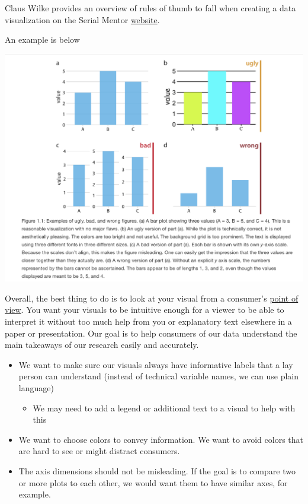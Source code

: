 \documentclass[
  letterpaper,
  DIV=11,
  numbers=noendperiod]{scrreprt}
\providecommand{\tightlist}{%
  \setlength{\itemsep}{0pt}\setlength{\parskip}{0pt}}\usepackage{longtable,booktabs,array}
\begin{document}
Claus Wilke provides an overview of rules of thumb to fall when creating
a data visualization on the Serial Mentor
\href{https://serialmentor.com/dataviz/}{website}.

An example is below

\includegraphics{images/ugbadwrong.png}

Overall, the best thing to do is to look at your visual from a
consumer's
\href{https://www.youtube.com/watch?v=nQJEp-k-ogs\&ab_channel=ArianaGrandeVevo}{point
of view}. You want your visuals to be intuitive enough for a viewer to
be able to interpret it without too much help from you or explanatory
text elsewhere in a paper or presentation. Our goal is to help consumers
of our data understand the main takeaways of our research easily and
accurately.

\begin{itemize}
\tightlist
\item
  We want to make sure our visuals always have informative labels that a
  lay person can understand (instead of technical variable names, we can
  use plain language)

  \begin{itemize}
  \tightlist
  \item
    We may need to add a legend or additional text to a visual to help
    with this
  \end{itemize}
\item
  We want to choose colors to convey information. We want to avoid
  colors that are hard to see or might distract consumers.
\item
  The axis dimensions should not be misleading. If the goal is to
  compare two or more plots to each other, we would want them to have
  similar axes, for example.
\end{itemize}
\end{document}
